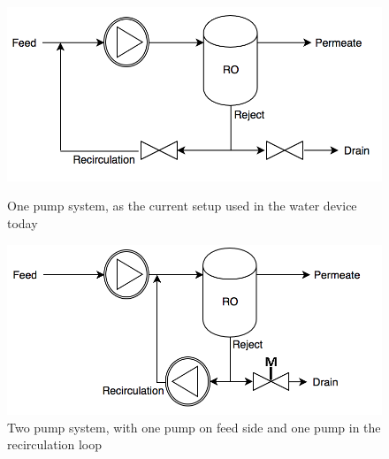 \begin{figure}[h]
\centering
\begin{minipage}{.5\textwidth}
    \centering
    \includegraphics[width=1\textwidth]{Sys1}
    \caption{One pump system, as the current setup used in the water device today}
    \label{fig:System1}
\end{minipage}%
\begin{minipage}{.5\textwidth}
  \centering
  \includegraphics[width=1\linewidth]{Sys2}
  \caption{Two pump system, with one pump on feed side and one pump in the recirculation loop}
  \label{fig:System2}
\end{minipage}
\end{figure}

\newpage

